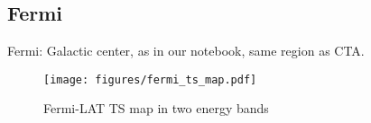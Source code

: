 \subsection{Fermi}
\label{ssec:fermi}

Fermi: Galactic center, as in our notebook, same region as CTA.

\begin{figure*}[t]
	\centering
	\texttt{[image: figures/fermi\_ts\_map.pdf]}
	\caption{
		Fermi-LAT TS map in two energy bands}
	\label{fig:fermi_ts_map}
\end{figure*}